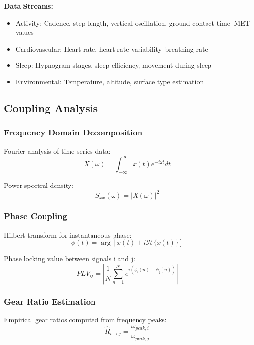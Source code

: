 \documentclass[12pt,twocolumn]{article}
\begin{document}
\textbf{Data Streams:}
\begin{itemize}
\item Activity: Cadence, step length, vertical oscillation, ground contact time, MET values
\item Cardiovascular: Heart rate, heart rate variability, breathing rate
\item Sleep: Hypnogram stages, sleep efficiency, movement during sleep
\item Environmental: Temperature, altitude, surface type estimation
\end{itemize}

\subsection{Coupling Analysis}

\subsubsection{Frequency Domain Decomposition}

Fourier analysis of time series data:
\begin{equation}
X(\omega) = \int_{-\infty}^{\infty} x(t) e^{-i\omega t} dt
\end{equation}

Power spectral density:
\begin{equation}
S_{xx}(\omega) = |X(\omega)|^2
\end{equation}

\subsubsection{Phase Coupling}

Hilbert transform for instantaneous phase:
\begin{equation}
\phi(t) = \arg[x(t) + i\mathcal{H}\{x(t)\}]
\end{equation}

Phase locking value between signals i and j:
\begin{equation}
PLV_{ij} = \left|\frac{1}{N}\sum_{n=1}^{N} e^{i(\phi_i(n) - \phi_j(n))}\right|
\end{equation}

\subsubsection{Gear Ratio Estimation}

Empirical gear ratios computed from frequency peaks:
\begin{equation}
\hat{R}_{i \to j} = \frac{\omega_{peak,i}}{\omega_{peak,j}}
\end{equation}
\end{document}
